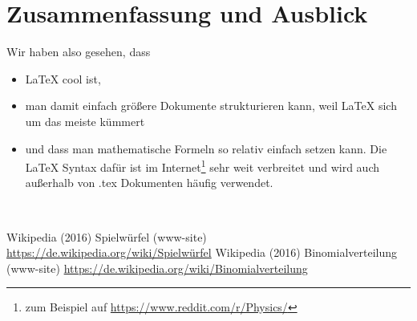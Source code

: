 \documentclass[12pt,a4paper]{scrartcl}
\begin{document}
\section{Zusammenfassung und Ausblick}
Wir haben also gesehen, dass
\begin{itemize}
    \item \LaTeX{} cool ist,
    \item man damit einfach größere Dokumente strukturieren kann,
        weil \LaTeX{} sich um das meiste kümmert
    \item und dass man mathematische Formeln so relativ einfach setzen kann.
        Die \LaTeX{} Syntax dafür ist im Internet\footnote{zum Beispiel
        auf \url{https://www.reddit.com/r/Physics/}} sehr weit verbreitet und
        wird auch außerhalb von .tex Dokumenten häufig verwendet.
\end{itemize}
\lipsum[2]




\newpage
\listoffigures 
~\\
\cprotect{}
\begin{thebibliography}{abc}
     Wikipedia (2016) Spielwürfel (www-site)
        \url{https://de.wikipedia.org/wiki/Spielwürfel}
     Wikipedia (2016) Binomialverteilung (www-site)
        \url{https://de.wikipedia.org/wiki/Binomialverteilung}
\end{thebibliography}
\cprotect{}
\end{document}
